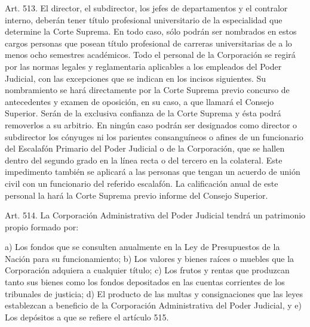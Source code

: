     Art. 513. El director, el subdirector, los jefes de departamentos y el contralor interno, deberán tener título profesional universitario de la especialidad que determine la Corte Suprema. En todo caso, sólo podrán ser nombrados en estos cargos personas que posean título profesional de carreras universitarias de a lo menos ocho semestres académicos.
    Todo el personal de la Corporación se regirá por las normas legales y reglamentaria aplicables a los empleados del Poder Judicial, con las excepciones que se indican en los incisos siguientes.
    Su nombramiento se hará directamente por la Corte Suprema previo concurso de antecedentes y examen de oposición, en su caso, a que llamará el Consejo Superior. Serán de la exclusiva confianza de la Corte Suprema y ésta podrá removerlos a su arbitrio.
    En ningún caso podrán ser designados como director o subdirector los cónyuges ni los parientes consanguíneos o afines de un funcionario del Escalafón Primario del Poder Judicial o de la Corporación, que se hallen dentro del segundo grado en la línea recta o del tercero en la colateral. Este impedimento también se aplicará a las personas que tengan un acuerdo de unión civil con un funcionario del referido escalafón.
    La calificación anual de este personal la hará la Corte Suprema previo informe del Consejo Superior.


    Art. 514. La Corporación Administrativa del Poder Judicial tendrá un patrimonio propio formado por:
   
    a) Los fondos que se consulten anualmente en la Ley de Presupuestos de la Nación para su funcionamiento;
    b) Los valores y bienes raíces o muebles que la Corporación adquiera a cualquier título;
    c) Los frutos y rentas que produzcan tanto sus bienes como los fondos depositados en las cuentas corrientes de los tribunales de justicia;
    d) El producto de las multas y consignaciones que las leyes establezcan a beneficio de la Corporación Administrativa del Poder Judicial, y
    e) Los depósitos a que se refiere el artículo 515.


